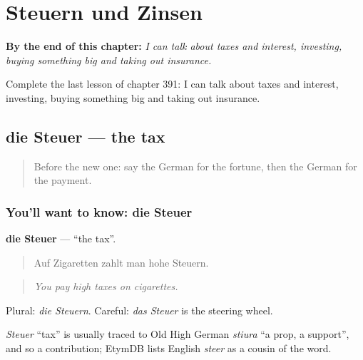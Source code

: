 
\chapter{Steuern und Zinsen}
\label{ch:ge-steuern-und-zinsen}

\begin{chapteropening}
\textbf{By the end of this chapter:} \emph{I can talk about taxes and interest, investing, buying something big and taking out insurance.}

Complete the last lesson of chapter 391: I can talk about taxes and interest, investing, buying something big and taking out insurance.
\end{chapteropening}

\section[die Steuer]{die Steuer — the tax}

\label{lesson:GE-C391-steuer}



\begin{quote}
Before the new one: say the German for the fortune, then the German for the payment.
\end{quote}

\subsection*{You'll want to know: die Steuer}
\textbf{die Steuer} — \textquotedblleft{}the tax\textquotedblright{}.

\begin{quote}
Auf Zigaretten zahlt man hohe Steuern.
\end{quote}

\begin{quote}
\emph{You pay high taxes on cigarettes.}
\end{quote}

Plural: \emph{die Steuern}. Careful: \emph{das Steuer} is the steering wheel.

\begin{cousinweb}
\emph{Steuer} \textquotedblleft{}tax\textquotedblright{} is usually traced to Old High German \emph{stiura} \textquotedblleft{}a prop, a support\textquotedblright{}, and so a contribution; EtymDB lists English \emph{steer} as a cousin of the word.
\end{cousinweb}

